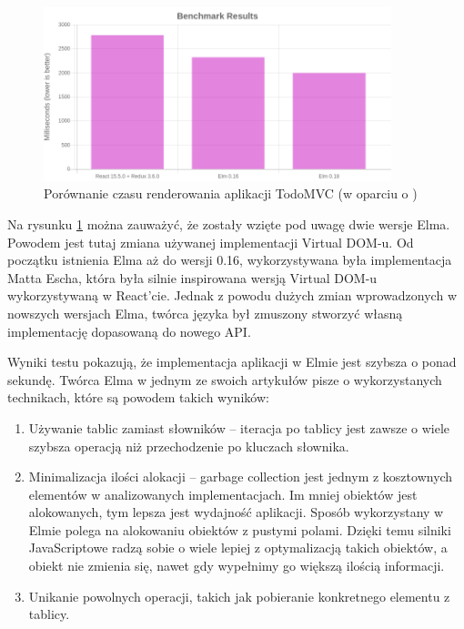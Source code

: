 \begin{figure}[h]
	\centering
	\includegraphics[width=0.9\textwidth]{images/render_comparision}
	\caption{Porównanie czasu renderowania aplikacji TodoMVC (w oparciu o \cite{perComp})}
	\label{fig:performanceComparision}
\end{figure}

Na rysunku \ref{fig:performanceComparision} można zauważyć, że zostały wzięte pod uwagę dwie wersje Elma. Powodem jest tutaj zmiana używanej implementacji Virtual DOM-u. Od początku istnienia Elma aż do wersji 0.16, wykorzystywana była implementacja Matta Escha, która była silnie inspirowana wersją Virtual DOM-u wykorzystywaną w React'cie. Jednak z powodu dużych zmian wprowadzonych w nowszych wersjach Elma, twórca języka był zmuszony stworzyć własną implementację dopasowaną do nowego API. 

Wyniki testu pokazują, że implementacja aplikacji w Elmie jest szybsza o ponad sekundę. Twórca Elma w jednym ze swoich artykułów \cite{blazingFastHtml} pisze o wykorzystanych technikach, które są powodem takich wyników:
\begin{enumerate}
	\item Używanie tablic zamiast słowników -- iteracja po tablicy jest zawsze o wiele szybsza operacją niż przechodzenie po kluczach słownika.
	\item Minimalizacja ilości alokacji -- garbage collection jest jednym z kosztownych elementów w analizowanych implementacjach. Im mniej obiektów jest alokowanych, tym lepsza jest wydajność aplikacji. Sposób wykorzystany w Elmie polega na alokowaniu obiektów z pustymi polami. Dzięki temu silniki JavaScriptowe radzą sobie o wiele lepiej z optymalizacją takich obiektów, a obiekt nie zmienia się, nawet gdy wypełnimy go większą ilością informacji.
	\item Unikanie powolnych operacji, takich jak pobieranie konkretnego elementu z tablicy. 
\end{enumerate}


